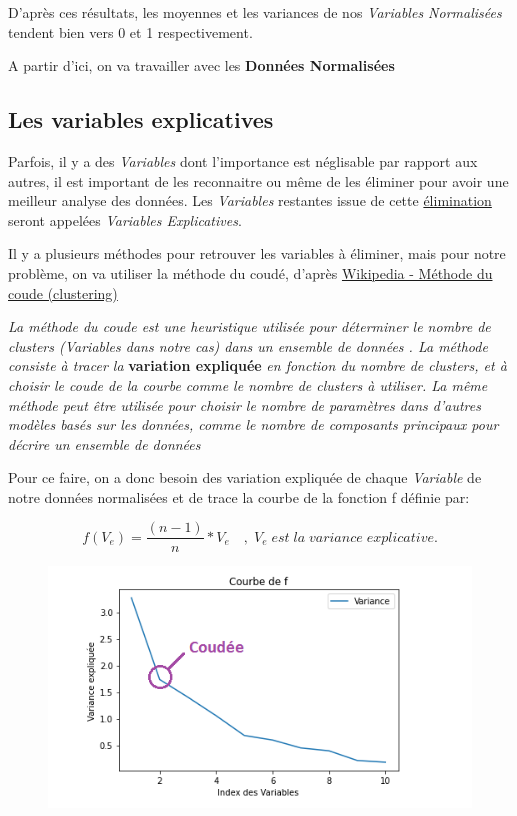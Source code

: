 \documentclass{article}
\begin{document}
D'après ces résultats, les moyennes et les variances de nos \textit{Variables Normalisées} tendent bien vers 0 et 1 respectivement.
\newline

A partir d'ici, on va travailler avec les \textbf{Données Normalisées} 

\newpage

\subsection{Les variables explicatives}

Parfois, il y a des \textit{Variables} dont l'importance est néglisable par rapport aux autres, il est important de les reconnaitre ou même de les éliminer pour avoir une meilleur analyse des données. Les \textit{Variables} restantes issue de cette \underline{élimination} seront appelées \textit{Variables Explicatives}.
\newline

Il y a plusieurs méthodes pour retrouver les variables à éliminer, mais pour notre problème, on va utiliser la méthode du coudé, d'après \href{https://fr.qaz.wiki/wiki/Elbow_method_(clustering)}{Wikipedia - Méthode du coude (clustering)} 
\newline

\textit{La méthode du coude est une heuristique utilisée pour déterminer le nombre de clusters (Variables dans notre cas) dans un ensemble de données . La méthode consiste à tracer la} \textbf{variation expliquée} \textit{en fonction du nombre de clusters, et à choisir le coude de la courbe comme le nombre de clusters à utiliser. La même méthode peut être utilisée pour choisir le nombre de paramètres dans d'autres modèles basés sur les données, comme le nombre de composants principaux pour décrire un ensemble de données}
\newline

Pour ce faire, on a donc besoin des variation expliquée de chaque \textit{Variable} de notre données normalisées et de trace la courbe de la fonction f définie par:

\begin{equation*}
f(V_e)=\frac{(n-1)}{n}*V_e \quad , \; V_e \; est \; la  \; variance \; explicative.
\end{equation*}

\begin{figure}[h!]
\includegraphics[width=\linewidth]{images/courbe_ve.png}
\end{figure}
\end{document}
